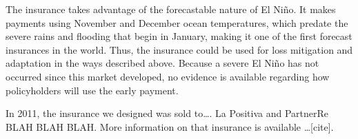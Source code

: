 \documentclass[authoryear]{article}
\begin{document}
The insurance takes advantage of the forecastable nature of El Ni\~no. It makes payments using November and December ocean temperatures, which predate the severe rains and flooding that begin in January, making it one of the first forecast insurances in the world. Thus, the insurance could be used for loss mitigation and adaptation in the ways described above. Because a severe El Ni\~no has not occurred since this market developed, no evidence is available regarding how policyholders will use the early payment.

In 2011, the insurance we designed was sold to\ldots. La Positiva and PartnerRe BLAH BLAH BLAH. More information on that insurance is available \ldots [cite].

\end{document}
